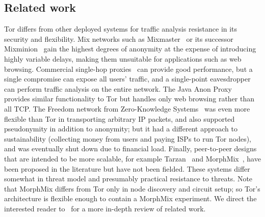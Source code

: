 \documentclass{llncs}
\begin{document}
\subsection{Related work}
Tor differs from other deployed systems for traffic analysis resistance
in its security and flexibility.  Mix networks such as
Mixmaster~\cite{mixmaster-spec} or its successor Mixminion~\cite{minion-design}
gain the highest degrees of anonymity at the expense of introducing highly
variable delays, making them unsuitable for applications such as web
browsing.  Commercial single-hop
proxies~\cite{anonymizer} can provide good performance, but
a single compromise can expose all users' traffic, and a single-point
eavesdropper can perform traffic analysis on the entire network.
The Java
Anon Proxy~\cite{web-mix} provides similar functionality to Tor but
handles only web browsing rather than all TCP\@.
The Freedom 
network from Zero-Knowledge Systems~\cite{freedom21-security}
was even more flexible than Tor in
transporting arbitrary IP packets, and also supported
pseudonymity in addition to anonymity; but it had
a different approach to sustainability (collecting money from users
and paying ISPs to run Tor nodes), and was eventually shut down due to financial
load.  Finally, %
peer-to-peer designs that are intended to be more scalable,
for example Tarzan~\cite{tarzan:ccs02} and
MorphMix~\cite{morphmix:fc04}, have been proposed in the literature but
have not been fielded. These systems differ somewhat
in threat model and presumably practical resistance to threats.
Note that MorphMix differs from Tor only in
node discovery and circuit setup; so Tor's architecture is flexible
enough to contain a MorphMix experiment.
We direct the interested reader
to~\cite{tor-design} for a more in-depth review of related work.


\end{document}
